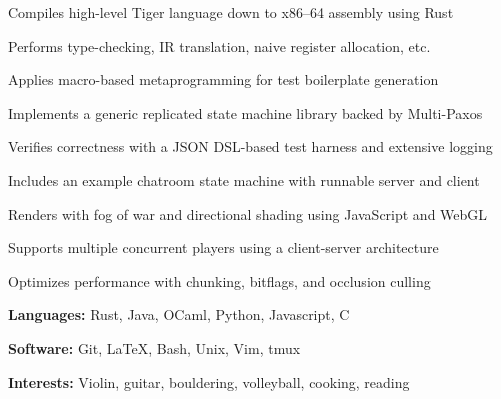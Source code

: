 \documentclass{resume}
\begin{document}
\begin{projects}
    \begin{description}
        \item Compiles high-level Tiger language down to x86--64 assembly using Rust
        \item Performs type-checking, IR translation, naive register allocation, etc.
        \item Applies macro-based metaprogramming for test boilerplate generation
    \end{description}

    \begin{description}
        \item Implements a generic replicated state machine library backed by Multi-Paxos
        \item Verifies correctness with a JSON DSL-based test harness and extensive logging
        \item Includes an example chatroom state machine with runnable server and client
    \end{description}

    \begin{description}
        \item Renders with fog of war and directional shading using JavaScript and WebGL
        \item Supports multiple concurrent players using a client-server architecture
        \item Optimizes performance with chunking, bitflags, and occlusion culling
    \end{description}
\end{projects}

\begin{skills}
    \begin{description}
        \item \textbf{Languages:} Rust, Java, OCaml, Python, Javascript, C
        \item \textbf{Software:} Git, LaTeX, Bash, Unix, Vim, tmux
        \item \textbf{Interests:} Violin, guitar, bouldering, volleyball, cooking, reading
    \end{description}
\end{skills}
\end{document}
